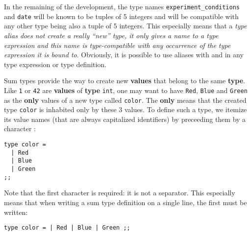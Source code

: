 \vspace{0.2cm}
\begin{syn}
 \is {}   
\end{syn}
\vspace{0.2cm}

In the remaining of the development, the type names
{\tt  experiment\_conditions} and {\tt date} will be known to be
tuples of 5 integers and will be compatible with any other type being
also a tuple of 5 integers. This especially means that a {\em type alias
does not create a really ``new'' type, it only gives a name to a type
expression and this name is type-compatible with any occurrence of the
type expression it is bound to}. Obviously, it is possible to use
aliases with and in any type expression or type definition.








\vspace{0.5cm}

Sum types provide the way to create new {\bf values} that
 belong to the same {\bf type}. Like {\tt 1} or {\tt 42} are
{\bf values} of {\bf type} {\tt int}, one may want to have {\tt Red},
{\tt Blue} and {\tt Green} as the {\bf only} values of a new type
called  {\tt color}. The {\bf only}  means that the created type {\tt color}
is inhabited only by these 3 values. To define
such a type, we itemize its value names (that are always capitalized
identifiers) by  preceeding them by a \terminal{\vertical} character :

{\scriptsize
\begin{lstlisting}
type color =
  | Red
  | Blue
  | Green
;;
\end{lstlisting}
}
Note that the first \terminal{\vertical} character is required: it is not a
separator. This especially means that when writing a sum type
definition on a single line, the first \terminal{\vertical} must be written:
{\scriptsize
\begin{lstlisting}
type color = | Red | Blue | Green ;;
\end{lstlisting}
}

